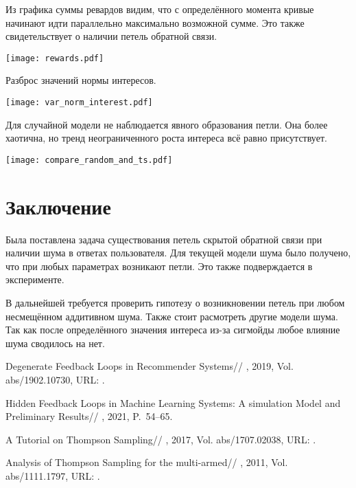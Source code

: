\documentclass[12pt, twoside]{article}
\begin{document}
Из графика суммы ревардов видим, что с определённого момента кривые начинают идти параллельно максимально возможной сумме. 
Это также свидетельствует о наличии петель обратной связи. 
\begin{center}
  \texttt{[image: rewards.pdf]}
\end{center}

Разброс значений нормы интересов. 
\begin{center}
  \texttt{[image: var\_norm\_interest.pdf]}
\end{center}

Для случайной модели не наблюдается явного образования петли. 
Она более хаотична, но тренд неограниченного роста интереса всё равно присутствует.   
\begin{center}
  \texttt{[image: compare\_random\_and\_ts.pdf]}
\end{center}


\begin{figure}[ht]
\end{figure}

\section{Заключение}
Была поставлена задача существования петель скрытой обратной связи при наличии шума в ответах пользователя. 
Для текущей модели шума было получено, что при любых параметрах возникают петли. 
Это также подверждается в эксперименте.

В дальнейшей требуется проверить гипотезу о возникновении петель при любом несмещённом аддитивном шума. 
Также стоит расмотреть другие модели шума. 
Так как после определённого значения интереса из-за сигмойды любое влияние шума сводилось на нет. 
\begin{thebibliography}{99}
    Degenerate Feedback Loops in Recommender Systems//
    , 2019, Vol. abs/1902.10730,
	  URL: .

    Hidden Feedback Loops in Machine Learning Systems: A simulation Model and Preliminary Results//
    , 2021, P.~54--65.

    A Tutorial on Thompson Sampling//
    , 2017, Vol. abs/1707.02038,
	  URL: .

    Analysis of Thompson Sampling for the multi-armed//
    , 2011, Vol. abs/1111.1797,
	  URL: .
\end{thebibliography}

\end{document}
